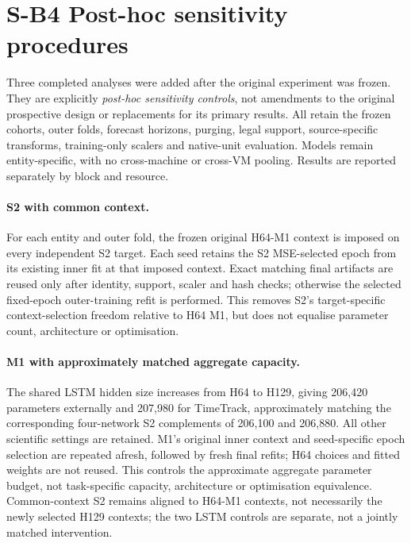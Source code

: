 \documentclass[a4paper,11pt]{article}
\begin{document}
\clearpage
\section*{S-B4 Post-hoc sensitivity procedures}
Three completed analyses were added after the original experiment was
frozen. They are explicitly \emph{post-hoc sensitivity
controls}, not amendments to the original prospective design or replacements
for its primary results. All retain the frozen cohorts, outer folds,
forecast horizons, purging, legal support, source-specific transforms,
training-only scalers and native-unit evaluation. Models remain
entity-specific, with no cross-machine or cross-VM pooling. Results are
reported separately by block and resource.

\paragraph{S2 with common context.}
For each entity and outer fold, the frozen original H64-M1 context is imposed
on every independent S2 target. Each seed retains the S2 MSE-selected epoch
from its existing inner fit at that imposed context. Exact matching final
artifacts are reused only after identity, support, scaler and hash checks;
otherwise the selected fixed-epoch outer-training refit is performed.
This removes S2's target-specific context-selection freedom relative to
H64 M1, but does not equalise parameter count, architecture or optimisation.

\paragraph{M1 with approximately matched aggregate capacity.}
The shared LSTM hidden size increases from H64 to H129, giving 206,420
parameters externally and 207,980 for TimeTrack, approximately matching the
corresponding four-network S2 complements of 206,100 and 206,880. All other
scientific settings are retained. M1's original inner context and
seed-specific epoch selection are repeated afresh, followed by fresh final
refits; H64 choices and fitted weights are not reused. This controls the
approximate aggregate parameter budget, not task-specific capacity,
architecture or optimisation equivalence. Common-context S2 remains aligned
to H64-M1 contexts, not necessarily the newly selected H129 contexts; the
two LSTM controls are separate, not a jointly matched intervention.
\end{document}
